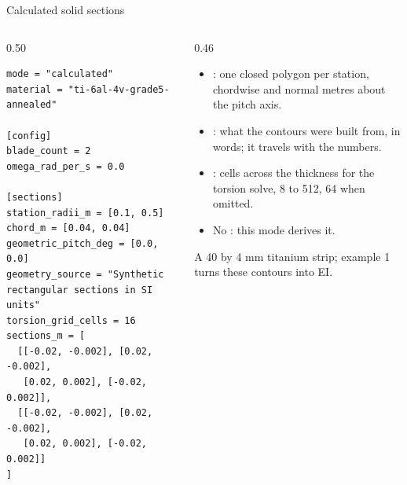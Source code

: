 \begin{frame}[fragile]{Calculated solid sections}
\begin{columns}[T]
\begin{column}{0.50\textwidth}
\begin{lstlisting}[style=ftsbase, basicstyle=\ttfamily\tiny]
mode = "calculated"
material = "ti-6al-4v-grade5-annealed"

[config]
blade_count = 2
omega_rad_per_s = 0.0

[sections]
station_radii_m = [0.1, 0.5]
chord_m = [0.04, 0.04]
geometric_pitch_deg = [0.0, 0.0]
geometry_source = "Synthetic rectangular sections in SI units"
torsion_grid_cells = 16
sections_m = [
  [[-0.02, -0.002], [0.02, -0.002],
   [0.02, 0.002], [-0.02, 0.002]],
  [[-0.02, -0.002], [0.02, -0.002],
   [0.02, 0.002], [-0.02, 0.002]]
]
\end{lstlisting}
\end{column}
\begin{column}{0.46\textwidth}
\begin{itemize}\small
  \item {}: one closed polygon per station, chordwise and
        normal metres about the pitch axis.
  \item {}: what the contours were built from, in
        words; it travels with the numbers.
  \item {}: cells across the thickness for the
        torsion solve, 8 to 512, 64 when omitted.
  \item No : this mode derives it.
\end{itemize}
\begin{takeaway}
A 40 by 4 mm titanium strip; example 1 turns these contours into EI.
\end{takeaway}
\end{column}
\end{columns}
\end{frame}

